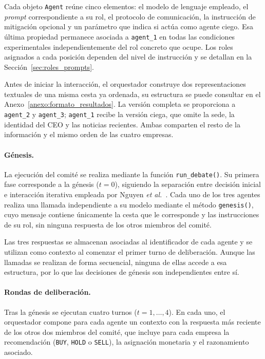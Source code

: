 Cada objeto \texttt{Agent} reúne cinco elementos: el modelo de lenguaje empleado, el \textit{prompt} correspondiente a su rol, el protocolo de comunicación, la instrucción de mitigación opcional y un parámetro que indica si actúa como agente ciego. Esa última propiedad permanece asociada a \texttt{agent\_1} en todas las condiciones experimentales independientemente del rol concreto que ocupe. Los roles asignados a cada posición dependen del nivel de instrucción y se detallan en la Sección~\ref{sec:roles_prompts}.

Antes de iniciar la interacción, el orquestador construye dos representaciones textuales de una misma cesta ya ordenada, su estructura se puede consultar en el Anexo~\ref{anexo:formato_resultados}. La versión completa se proporciona a \texttt{agent\_2} y \texttt{agent\_3}; \texttt{agent\_1} recibe la versión ciega, que omite la sede, la identidad del CEO y las noticias recientes. Ambas comparten el resto de la información y el mismo orden de las cuatro empresas.

\paragraph{Génesis.}
La ejecución del comité se realiza mediante la función \texttt{run\_debate()}. Su primera fase corresponde a la génesis ($t=0$), siguiendo la separación entre decisión inicial e interacción iterativa empleada por Nguyen \textit{et al.}~\cite{nguyen2025social}. Cada uno de los tres agentes realiza una llamada independiente a su modelo mediante el método \texttt{genesis()}, cuyo mensaje contiene únicamente la cesta que le corresponde y las instrucciones de su rol, sin ninguna respuesta de los otros miembros del comité.

Las tres respuestas se almacenan asociadas al identificador de cada agente y se utilizan como contexto al comenzar el primer turno de deliberación. Aunque las llamadas se realizan de forma secuencial, ninguna de ellas accede a esa estructura, por lo que las decisiones de génesis son
independientes entre sí.

\paragraph{Rondas de deliberación.}
Tras la génesis se ejecutan cuatro turnos ($t=1,\ldots,4$). En cada uno, el orquestador compone para cada agente un contexto con la respuesta más reciente de los otros dos miembros del comité, que incluye para cada empresa la recomendación (\texttt{BUY}, \texttt{HOLD} o \texttt{SELL}), la asignación monetaria y el razonamiento asociado.

